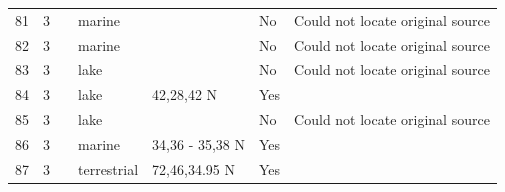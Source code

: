 \documentclass[12pt]{article}
\begin{document}
\begin{landscape}
\begin{table}[h!]
{\begin{tabular}{p{2.8cm}p{1.3cm}p{5.5cm}p{2.2cm}p{2.5cm}lp{3.5cm}}
        81    & 3 & \cite{Hatanaka1977}  & marine &       & No    & Could not locate original source \\
        82    & 3 & \cite{Cohen1990} & marine &       & No    & Could not locate original source \\
        83    & 3 & \cite{Cohen1990}  & lake &       & No    & Could not locate original source \\
        84    & 3 & \cite{Wilbur1972}    & lake & 42,28,42 N & Yes   &       \\
        85    & 3 & \cite{Mizuno1982}  & lake &       & No    & Could not locate original source \\
        86    & 3 & \cite{Hogetsu1979}  & marine & 34,36 - 35,38 N & Yes   &       \\
        87    & 3 & \cite{Bradstreet1982}  & terrestrial & 72,46,34.95 N & Yes   &       \\
        \hline
      \end{tabular}}%
      \end{table}

        \newpage


\end{landscape}
\end{document}
